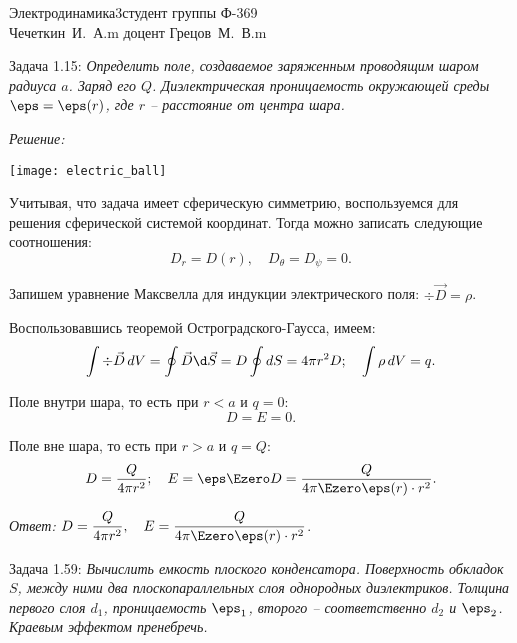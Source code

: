 





\newcommand{\ds}{\displaystyle}


{Электродинамика}{3}{}{студент группы Ф-369\\Чечеткин~И.~А.}{m}
{доцент Грецов~М.~В.}{m}

\newpage
Задача 1.15: \emph{Определить поле, создаваемое заряженным проводящим шаром
радиуса \( a \). Заряд его \( Q \). Диэлектрическая проницаемость окружающей
среды \( \eps = \eps(r) \), где \( r \) -- расстояние от центра шара.}

\vspace*{2em}
\emph{Решение:}

\begin{minipage}{.4\textwidth}
    \texttt{[image: electric\_ball]}
\end{minipage}
\begin{minipage}{.55\textwidth}
Учитывая, что задача имеет сферическую симметрию, воспользуемся для решения
сферической системой координат. Тогда можно записать следующие соотношения:
\[
	D_r = D(r), \quad D_\theta = D_\psi = 0.
\]

Запишем уравнение Максвелла для индукции электрического поля:
\( \div{\vec{D}} = \rho \).
\end{minipage}

Воспользовавшись теоремой Остроградского-Гаусса, имеем:
\[
	\int \div\vec{D}\,dV = \oint \vec{D}\d\vec{S} = D \oint dS = 4\pi r^2 D; \quad
	\int \rho\,dV = q.
\]

Поле внутри шара, то есть при \( r < a \) и \( q = 0 \):
\[
	D = E = 0.
\]

Поле вне шара, то есть при \( r > a \) и \( q = Q \):
\[
	D = \frac{Q}{4\pi r^2}; \quad
	E = \eps\Ezero D = \frac{Q}{4\pi\Ezero\eps(r) \cdot r^2}.
\]

\vspace*{2em}   
\emph{Ответ:} \( \ds D = \frac{Q}{4\pi r^2}, \quad
E = \frac{Q}{4\pi\Ezero\eps(r) \cdot r^2} \).

\newpage
Задача 1.59: \emph{Вычислить емкость плоского конденсатора. Поверхность
обкладок \( S \), между ними два плоскопараллельных слоя однородных
диэлектриков. Толщина первого слоя \( d_1 \), проницаемость \( \eps_1 \),
второго -- соответственно \( d_2 \) и \( \eps_2 \). Краевым эффектом
пренебречь.}

